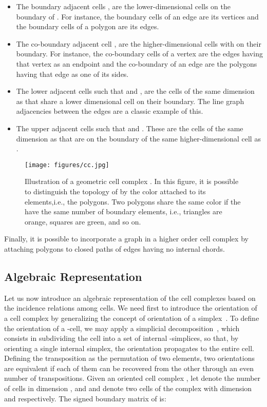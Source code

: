 \documentclass{article}
\begin{document}
\begin{itemize}
    \item The boundary adjacent cells     , are the lower-dimensional cells on the
boundary of . For instance, the boundary cells of an edge are its vertices and the boundary cells of a polygon are its edges.

    \item The co-boundary adjacent cell      , are the higher-dimensional cells with
     on their boundary. For instance, the co-boundary cells of a vertex are the edges having that vertex as an endpoint and the co-boundary of an edge are the polygons having that edge as one of its sides. 
    
    \item The lower adjacent cells      such that  and , are the cells of
the same dimension as  that share a lower dimensional cell on their boundary. The line graph
adjacencies between the edges are a classic example of this.

     \item The upper adjacent cells      such that  and . These are the cells of
the same dimension as  that are on the boundary of the same higher-dimensional cell as . 
\end{itemize}

\begin{figure}[t]
    \centering
    \texttt{[image: figures/cc.jpg]}
    \caption{Illustration of a geometric cell complex . In this figure, it is possible to distinguish the topology of  by the color attached to its elements,i.e., the polygons. Two polygons share the same color if the have the same number of boundary elements, i.e., triangles are orange, squares are green, and so on.}
    \label{fig:cc}
\end{figure}

Finally, it is possible to incorporate a graph  in a higher order cell complex  by attaching polygons to closed paths of edges having no internal chords. 

\subsection{Algebraic Representation}

Let us now introduce an algebraic representation of the cell complexes based on the incidence relations among cells. We need first to introduce
the orientation of a cell complex
by generalizing the concept of orientation of a simplex~\cite{bodnar2021weisfeiler, grady2010discrete}. To define the orientation of a -cell, we may apply a simplicial decomposition~\cite{grady2010discrete}, which consists in  subdividing the cell into a set of internal -simplices, so that, by orienting a single internal simplex, the orientation propagates to the entire cell. Defining the transposition as the permutation of two elements, two orientations are equivalent if each of them can be recovered from the other through an even number of transpositions. 
Given an oriented cell complex , let  denote the number of cells in dimension , and  and  denote two cells of the complex with dimension  and  respectively. 
The  signed boundary matrix  of  is:
\end{document}
